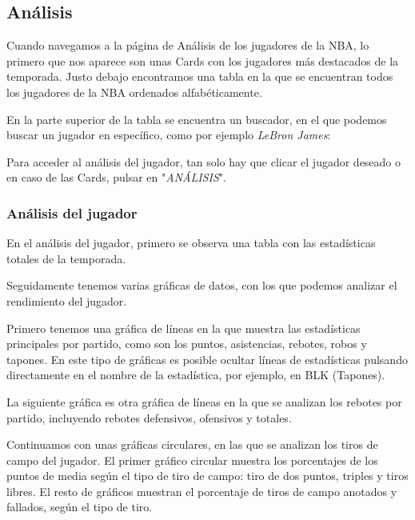 \subsection{Análisis}

Cuando navegamos a la página de Análisis de los jugadores de la NBA, lo primero que nos aparece son unas Cards con los jugadores más destacados de la temporada. Justo debajo encontramos una tabla en la que se encuentran todos los jugadores de la NBA ordenados alfabéticamente.


En la parte superior de la tabla se encuentra un buscador, en el que podemos buscar un jugador en específico, como por ejemplo \textit{LeBron James}:

Para acceder al análisis del jugador, tan solo hay que clicar el jugador deseado o en caso de las Cards, pulsar en "\textit{ANÁLISIS}".

\subsubsection{Análisis del jugador}

En el análisis del jugador, primero se observa una tabla con las estadísticas totales de la temporada.

Seguidamente tenemos varias gráficas de datos, con los que podemos analizar el rendimiento del jugador.

Primero tenemos una gráfica de líneas en la que muestra las estadísticas principales por partido, como son los puntos, asistencias, rebotes, robos y tapones. En este tipo de gráficas es posible ocultar líneas de estadísticas pulsando directamente en el nombre de la estadística, por ejemplo, en BLK (Tapones).

La siguiente gráfica es otra gráfica de líneas en la que se analizan los rebotes por partido, incluyendo rebotes defensivos, ofensivos y totales.

Continuamos con unas gráficas circulares, en las que se analizan los tiros de campo del jugador. El primer gráfico circular muestra los porcentajes de los puntos de media según el tipo de tiro de campo: tiro de dos puntos, triples y tiros libres. El resto de gráficos muestran el porcentaje de tiros de campo anotados y fallados, según el tipo de tiro.

